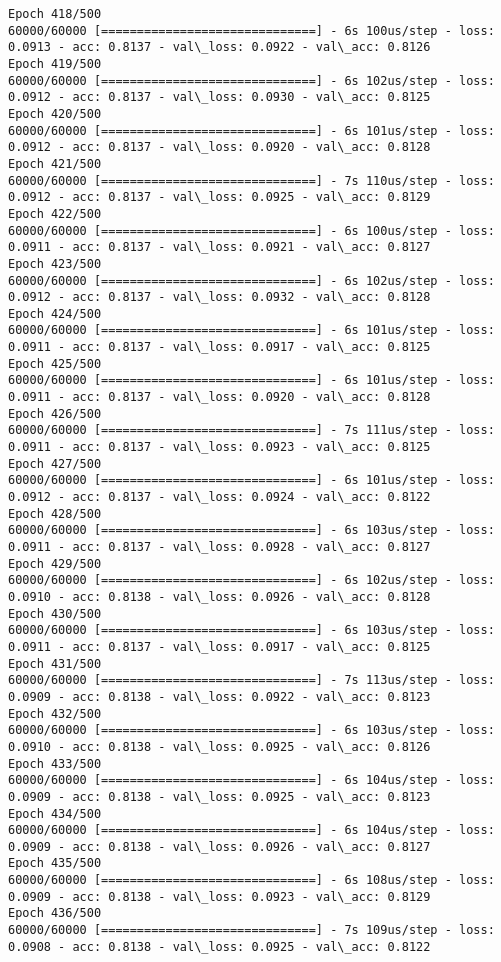 \documentclass[11pt]{article}
\begin{document}
\begin{Verbatim}[commandchars=\\\{\}]
Epoch 418/500
60000/60000 [==============================] - 6s 100us/step - loss: 0.0913 - acc: 0.8137 - val\_loss: 0.0922 - val\_acc: 0.8126
Epoch 419/500
60000/60000 [==============================] - 6s 102us/step - loss: 0.0912 - acc: 0.8137 - val\_loss: 0.0930 - val\_acc: 0.8125
Epoch 420/500
60000/60000 [==============================] - 6s 101us/step - loss: 0.0912 - acc: 0.8137 - val\_loss: 0.0920 - val\_acc: 0.8128
Epoch 421/500
60000/60000 [==============================] - 7s 110us/step - loss: 0.0912 - acc: 0.8137 - val\_loss: 0.0925 - val\_acc: 0.8129
Epoch 422/500
60000/60000 [==============================] - 6s 100us/step - loss: 0.0911 - acc: 0.8137 - val\_loss: 0.0921 - val\_acc: 0.8127
Epoch 423/500
60000/60000 [==============================] - 6s 102us/step - loss: 0.0912 - acc: 0.8137 - val\_loss: 0.0932 - val\_acc: 0.8128
Epoch 424/500
60000/60000 [==============================] - 6s 101us/step - loss: 0.0911 - acc: 0.8137 - val\_loss: 0.0917 - val\_acc: 0.8125
Epoch 425/500
60000/60000 [==============================] - 6s 101us/step - loss: 0.0911 - acc: 0.8137 - val\_loss: 0.0920 - val\_acc: 0.8128
Epoch 426/500
60000/60000 [==============================] - 7s 111us/step - loss: 0.0911 - acc: 0.8137 - val\_loss: 0.0923 - val\_acc: 0.8125
Epoch 427/500
60000/60000 [==============================] - 6s 101us/step - loss: 0.0912 - acc: 0.8137 - val\_loss: 0.0924 - val\_acc: 0.8122
Epoch 428/500
60000/60000 [==============================] - 6s 103us/step - loss: 0.0911 - acc: 0.8137 - val\_loss: 0.0928 - val\_acc: 0.8127
Epoch 429/500
60000/60000 [==============================] - 6s 102us/step - loss: 0.0910 - acc: 0.8138 - val\_loss: 0.0926 - val\_acc: 0.8128
Epoch 430/500
60000/60000 [==============================] - 6s 103us/step - loss: 0.0911 - acc: 0.8137 - val\_loss: 0.0917 - val\_acc: 0.8125
Epoch 431/500
60000/60000 [==============================] - 7s 113us/step - loss: 0.0909 - acc: 0.8138 - val\_loss: 0.0922 - val\_acc: 0.8123
Epoch 432/500
60000/60000 [==============================] - 6s 103us/step - loss: 0.0910 - acc: 0.8138 - val\_loss: 0.0925 - val\_acc: 0.8126
Epoch 433/500
60000/60000 [==============================] - 6s 104us/step - loss: 0.0909 - acc: 0.8138 - val\_loss: 0.0925 - val\_acc: 0.8123
Epoch 434/500
60000/60000 [==============================] - 6s 104us/step - loss: 0.0909 - acc: 0.8138 - val\_loss: 0.0926 - val\_acc: 0.8127
Epoch 435/500
60000/60000 [==============================] - 6s 108us/step - loss: 0.0909 - acc: 0.8138 - val\_loss: 0.0923 - val\_acc: 0.8129
Epoch 436/500
60000/60000 [==============================] - 7s 109us/step - loss: 0.0908 - acc: 0.8138 - val\_loss: 0.0925 - val\_acc: 0.8122

\end{Verbatim}
\end{document}
